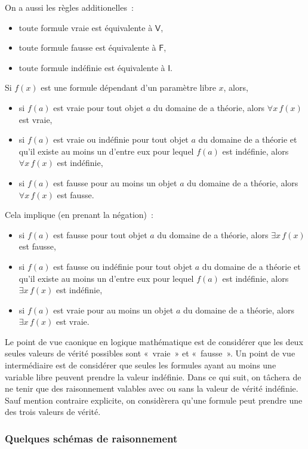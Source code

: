 On a aussi les règles additionelles : 
\begin{itemize}[nosep]
    \item toute formule vraie est équivalente à $\mathsf{V}$,
    \item toute formule fausse est équivalente à $\mathsf{F}$,
    \item toute formule indéfinie est équivalente à $\mathsf{I}$.
\end{itemize}

Si $f(x)$ est une formule dépendant d'un paramètre libre $x$, alors, 
\begin{itemize}[nosep]
    \item si $f(a)$ est vraie pour tout objet $a$ du domaine de a théorie, alors $\forall x \, f(x)$ est vraie,
    \item si $f(a)$ est vraie ou indéfinie pour tout objet $a$ du domaine de a théorie et qu'il existe au moins un d'entre eux pour lequel $f(a)$ est indéfinie, alors $\forall x \, f(x)$ est indéfinie,
    \item si $f(a)$ est fausse pour au moins un objet $a$ du domaine de a théorie, alors $\forall x \, f(x)$ est fausse.
\end{itemize}
Cela implique (en prenant la négation) : 
\begin{itemize}[nosep]
    \item si $f(a)$ est fausse pour tout objet $a$ du domaine de a théorie, alors $\exists x \, f(x)$ est fausse,
    \item si $f(a)$ est fausse ou indéfinie pour tout objet $a$ du domaine de a théorie et qu'il existe au moins un d'entre eux pour lequel $f(a)$ est indéfinie, alors $\exists x \, f(x)$ est indéfinie,
    \item si $f(a)$ est vraie pour au moins un objet $a$ du domaine de a théorie, alors $\exists x \, f(x)$ est vraie.
\end{itemize}

Le point de vue caonique en logique mathématique est de considérer que les deux seules valeurs de vérité possibles sont « vraie » et « fausse ». 
Un point de vue intermédiaire est de considérer que seules les formules ayant au moins une variable libre peuvent prendre la valeur indéfinie. 
Dans ce qui suit, on tâchera de ne tenir que des raisonnement valables avec ou sans la valeur de vérité indéfinie. 
Sauf mention contraire explicite, on considèrera qu'une formule peut prendre une des trois valeurs de vérité.

\subsubsection{Quelques schémas de raisonnement}

